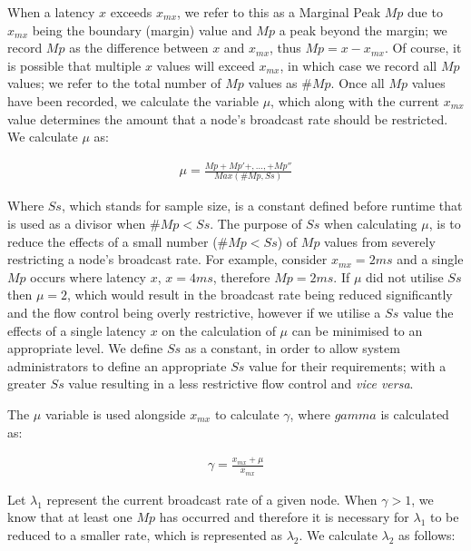     When a latency $x$ exceeds $x_{mx}$, we refer to this as a Marginal Peak $Mp$ due to $x_{mx}$ being the boundary (margin) value and $Mp$ a peak beyond the margin; we record $Mp$ as the difference between $x$ and $x_{mx}$, thus $Mp = x - x_{mx}$.  Of course, it is possible that multiple $x$ values will exceed $x_{mx}$, in which case we record all $Mp$ values; we refer to the total number of $Mp$ values as $\#Mp$.   Once all $Mp$ values have been recorded, we calculate the variable $\mu$, which along with the current $x_{mx}$ value determines the amount that a node's broadcast rate should be restricted.  We calculate $\mu$ as:
    
    \begin{equation*}
		     \begin{aligned}
		         \mu = \frac{Mp + Mp'+,\ldots,+ Mp''}{Max(\#Mp, Ss)}
		     \end{aligned}
    \end{equation*} 
    
    Where $Ss$, which stands for sample size, is a constant defined before runtime that is used as a divisor when $\#Mp < Ss$.  The purpose of $Ss$ when calculating $\mu$, is to reduce the effects of a small number ($\#Mp < Ss$) of $Mp$ values from severely restricting a node's broadcast rate.  For example, consider  $x_{mx} = 2ms$ and a single $Mp$ occurs where latency $x$, $x = 4ms$, therefore $Mp = 2ms$.  If $\mu$ did not utilise $Ss$ then $\mu = 2$, which would result in the broadcast rate being reduced significantly and the flow control being overly restrictive, however if we utilise a $Ss$ value the effects of a single latency $x$ on the calculation of $\mu$ can be minimised to an appropriate level.  We define $Ss$ as a constant, in order to allow system administrators to define an appropriate $Ss$ value for their requirements; with a greater $Ss$ value resulting in a less restrictive flow control and \emph{vice versa}.  
    
    The $\mu$ variable is used alongside $x_{mx}$ to calculate $\gamma$, where $gamma$ is calculated as:
    
    \begin{equation*}
		     \begin{aligned}
		         \gamma = \frac{x_{mx} + \mu}{x_{mx}}
		     \end{aligned}
    \end{equation*} 
    
    Let $\lambda_1$ represent the current broadcast rate of a given node.  When $\gamma > 1$, we know that at least one $Mp$ has occurred and therefore it is necessary for $\lambda_1$ to be reduced to a smaller rate, which is represented as $\lambda_2$.  We calculate $\lambda_2$ as follows:
    
